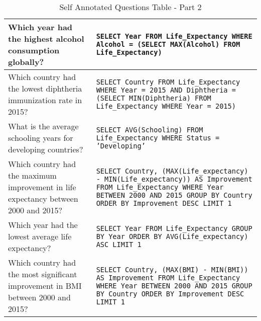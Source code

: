 \documentclass[11pt]{article}
\begin{document}
\begin{table*}[t]
\begin{tabular}{|p{}|p{}|}
Which year had the highest alcohol consumption globally? & \texttt{SELECT Year FROM Life\_Expectancy WHERE Alcohol = (SELECT MAX(Alcohol) FROM Life\_Expectancy)} \\ \hline
Which country had the lowest diphtheria immunization rate in 2015? & \texttt{SELECT Country FROM Life\_Expectancy WHERE Year = 2015 AND Diphtheria = (SELECT MIN(Diphtheria) FROM Life\_Expectancy WHERE Year = 2015)} \\ \hline
What is the average schooling years for developing countries? & \texttt{SELECT AVG(Schooling) FROM Life\_Expectancy WHERE Status = 'Developing'} \\ \hline
Which country had the maximum improvement in life expectancy between 2000 and 2015? & \texttt{SELECT Country, (MAX(Life\_expectancy) - MIN(Life\_expectancy)) AS Improvement FROM Life\_Expectancy WHERE Year BETWEEN 2000 AND 2015 GROUP BY Country ORDER BY Improvement DESC LIMIT 1} \\ \hline
Which year had the lowest average life expectancy? & \texttt{SELECT Year FROM Life\_Expectancy GROUP BY Year ORDER BY AVG(Life\_expectancy) ASC LIMIT 1} \\ \hline
Which country had the most significant improvement in BMI between 2000 and 2015? & \texttt{SELECT Country, (MAX(BMI) - MIN(BMI)) AS Improvement FROM Life\_Expectancy WHERE Year BETWEEN 2000 AND 2015 GROUP BY Country ORDER BY Improvement DESC LIMIT 1} \\ \hline

\end{tabular}
\caption{Self Annotated Questions Table - Part 2}
\label{append:3}
\end{table*}

\newpage
\end{document}
